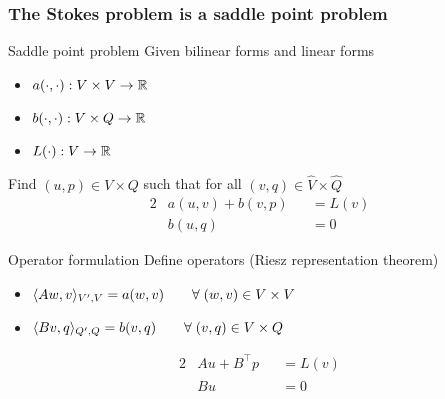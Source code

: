 \begin{frame}[shrink=5]
  \frametitle{The Stokes problem is a saddle point problem}
  \begin{block}{Saddle point problem}
  Given bilinear forms and linear forms
  \begin{itemize}
    \item $a(\cdot,\cdot): V\times V \to \mathbb{R}$
    \item $b(\cdot,\cdot): V\times Q \to \mathbb{R}$
    \item $L(\cdot): V \to \mathbb{R}$
  \end{itemize}
  Find $(u,p) \in V \times Q$
  such that
  for all  $(v,q) \in \widehat{V} \times \widehat{Q}$
  \begin{alignat}{2}
    &a(u,v) + b(v,p) & &= L(v) \nonumber
    \\
    &b(u,q) \phantom{a(u,v)} & &= 0 
  \end{alignat}
  \end{block}
  \vspace{-1em}
  \begin{block}{Operator formulation}
  Define operators (Riesz representation theorem)
  \begin{itemize}
    \item $\langle A w, v \rangle_{V',V}  = a (w,v) \qquad \forall \; (w,v) \in V
      \times V$
    \item $\langle B v, q \rangle_{Q',Q}  = b (v,q) \qquad \forall \; (v,q) \in V
      \times Q$
  \end{itemize}
  \vspace{-0.5em}
  \begin{alignat*}{2}
    &Au + B^{\top}p & &= L(v)
    \\
    &B u \phantom{B^{\top}} & &= 0
  \end{alignat*}
  \end{block}
\end{frame}
